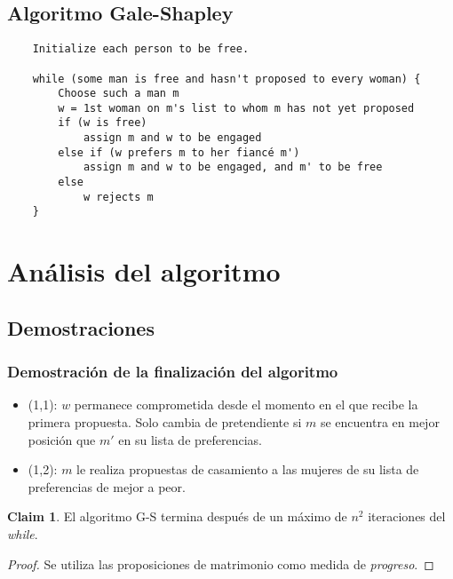 \documentclass[12pt, fleqn]{article}
\theoremstyle{remark}
\theoremstyle{definition}
\newtheorem*{definition}{Claim}
\begin{document}
\subsection{Algoritmo Gale-Shapley}
\begin{verbatim}
    Initialize each person to be free.

    while (some man is free and hasn't proposed to every woman) {
        Choose such a man m
        w = 1st woman on m's list to whom m has not yet proposed
        if (w is free)
            assign m and w to be engaged
        else if (w prefers m to her fiancé m')
            assign m and w to be engaged, and m' to be free
        else
            w rejects m
    }
\end{verbatim}
\section{Análisis del algoritmo}
\subsection{Demostraciones}
\subsubsection{Demostración de la finalización del algoritmo}
\begin{itemize}
    \item (1,1): $w$ permanece comprometida desde el momento en el que recibe la primera
            propuesta. Solo cambia de pretendiente si $m$ se encuentra en mejor 
            posición que $m'$ en su lista de preferencias.
    \item (1,2): $m$ le realiza propuestas de casamiento a las mujeres de su 
            lista de preferencias de mejor a peor. 
\end{itemize}
\begin{definition}
    El algoritmo G-S termina después de un máximo de $n^2$ iteraciones del \emph{while}.
\end{definition}
\begin{proof}
    Se utiliza las proposiciones de matrimonio como medida de \emph{progreso}.
\end{proof}
\end{document}

